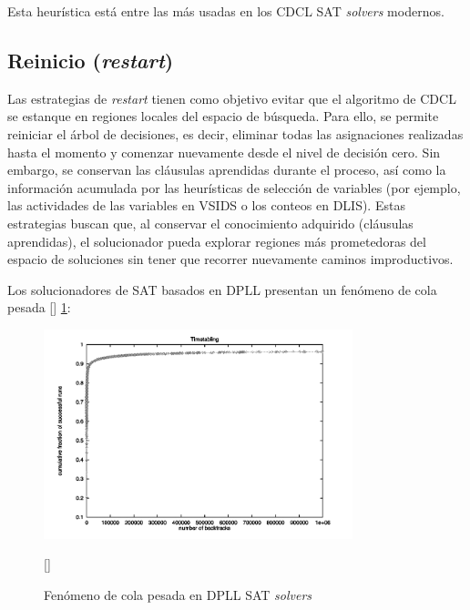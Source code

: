 
Esta heur\'istica est\'a entre las m\'as usadas en los CDCL SAT \textit{solvers} modernos.

\subsection{Reinicio (\textit{restart})}
\label{subsec:restart}

Las estrategias de \textit{restart} tienen como objetivo evitar que el algoritmo de CDCL se estanque en regiones locales del espacio de búsqueda. Para ello, se permite reiniciar el árbol de decisiones, es decir, eliminar todas las asignaciones realizadas hasta el momento y comenzar nuevamente desde el nivel de decisión cero. Sin embargo, se conservan las cláusulas aprendidas durante el proceso, así como la información acumulada por las heurísticas de selección de variables (por ejemplo, las actividades de las variables en VSIDS o los conteos en DLIS). Estas estrategias buscan que, al conservar el conocimiento adquirido (cláusulas aprendidas), el solucionador pueda explorar regiones más prometedoras del espacio de soluciones sin tener que recorrer nuevamente caminos improductivos.

Los solucionadores de SAT basados en DPLL presentan un fen\'omeno de cola pesada [\cite{oliveras2009dpll_cdcl}] \ref{fig:cola_pesada}:

\begin{figure}[ht]
    \centering
    \includegraphics[width=0.8\textwidth]{Graphics/cola_pesada.png}
    \caption{Fen\'omeno de cola pesada en DPLL SAT \textit{solvers}}
    [\cite{oliveras2009dpll_cdcl}]
    \label{fig:cola_pesada}
\end{figure}

